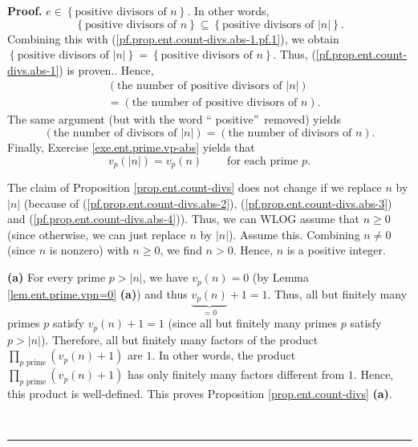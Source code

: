 \documentclass[numbers=enddot,12pt,final,onecolumn,notitlepage]{scrartcl}%
\numberwithin{exer}{subsection}
\theoremstyle{definition}
\newenvironment{proof}[1][Proof]{\noindent\textbf{#1.} }{\ \rule{0.5em}{0.5em}}
\let\prodnonlimits\prod
\renewcommand{\prod}{\prodnonlimits\limits}
\begin{document}
\begin{proof}
{$e\in\left\{  \text{positive divisors of }n\right\}  $. In other words,%
\[
\left\{  \text{positive divisors of }n\right\}  \subseteq\left\{
\text{positive divisors of }\left\vert n\right\vert \right\}  .
\]
Combining this with (\ref{pf.prop.ent.count-divs.abs-1.pf.1}), we obtain
$\left\{  \text{positive divisors of }\left\vert n\right\vert \right\}
=\left\{  \text{positive divisors of }n\right\}  $. Thus,
(\ref{pf.prop.ent.count-divs.abs-1}) is proven.}. Hence,%
\begin{align}
&  \left(  \text{the number of positive divisors of }\left\vert n\right\vert
\right) \nonumber\\
&  =\left(  \text{the number of positive divisors of }n\right)  .
\label{pf.prop.ent.count-divs.abs-2}%
\end{align}
The same argument (but with the word \textquotedblleft
positive\textquotedblright\ removed) yields%
\begin{equation}
\left(  \text{the number of divisors of }\left\vert n\right\vert \right)
=\left(  \text{the number of divisors of }n\right)  .
\label{pf.prop.ent.count-divs.abs-3}%
\end{equation}
Finally, Exercise \ref{exe.ent.prime.vp-abs} yields that
\begin{equation}
v_{p}\left(  \left\vert n\right\vert \right)  =v_{p}\left(  n\right)
\ \ \ \ \ \ \ \ \ \ \text{for each prime }p.
\label{pf.prop.ent.count-divs.abs-4}%
\end{equation}


The claim of Proposition \ref{prop.ent.count-divs} does not change if we
replace $n$ by $\left\vert n\right\vert $ (because of
(\ref{pf.prop.ent.count-divs.abs-2}), (\ref{pf.prop.ent.count-divs.abs-3}) and
(\ref{pf.prop.ent.count-divs.abs-4})). Thus, we can WLOG assume that $n\geq0$
(since otherwise, we can just replace $n$ by $\left\vert n\right\vert $).
Assume this. Combining $n\neq0$ (since $n$ is nonzero) with $n\geq0$, we find
$n>0$. Hence, $n$ is a positive integer.

\textbf{(a)} For every prime $p>\left\vert n\right\vert $, we have
$v_{p}\left(  n\right)  =0$ (by Lemma \ref{lem.ent.prime.vpn=0} \textbf{(a)})
and thus $\underbrace{v_{p}\left(  n\right)  }_{=0}+1=1$. Thus, all but
finitely many primes $p$ satisfy $v_{p}\left(  n\right)  +1=1$ (since all but
finitely many primes $p$ satisfy $p>\left\vert n\right\vert $). Therefore, all
but finitely many factors of the product $\prod_{p\text{ prime}}\left(
v_{p}\left(  n\right)  +1\right)  $ are $1$. In other words, the product
$\prod_{p\text{ prime}}\left(  v_{p}\left(  n\right)  +1\right)  $ has only
finitely many factors different from $1$. Hence, this product is well-defined.
This proves Proposition \ref{prop.ent.count-divs} \textbf{(a)}.


\end{proof}
\end{document}
